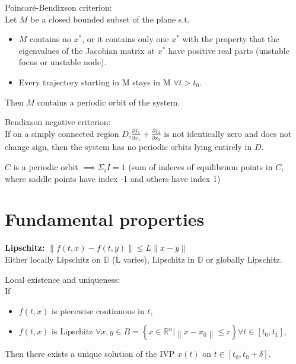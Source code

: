 \begin{tcolorbox}[colback=white, colframe=teal]
\begin{lemma}
    Poincaré-Bendixson criterion:\\
    Let $M$ be a closed bounded subset of the plane s.t.
    \begin{itemize}[topsep=0pt]
        \item $M$ contains no $x^*$, or it
        contains only one $x^*$ with the property that
        the eigenvalues of the Jacobian matrix at $x^*$ have
        positive real parts (unstable focus or unstable node).
        \item Every trajectory starting in M stays in M $\forall t>t_0$.
    \end{itemize}
    Then $M$ contains a periodic orbit of the system.
\end{lemma}
\end{tcolorbox}

\begin{lemma}
    Bendixson negative criterion:\\
    If on a simply connected region $D$,$\frac{\partial f_{1}}{\partial x_{1}}+\frac{\partial f_{2}}{\partial x_{2}}$ is not identically zero and does not change sign, then the
    system has no periodic orbits lying entirely in $D$.
\end{lemma}

\begin{corollary}
    $C$ is a periodic orbit $\implies \Sigma_i I = 1$ (sum of indeces of equilibrium points in $C$, where saddle points have index -1 and others have index 1)
\end{corollary}

\section{Fundamental properties}
\begin{tcolorbox}[colback=white, colframe=teal]
\textbf{Lipschitz:} $\|f(t, x)-f(t, y)\| \leq L\|x-y\|$ \\
Either locally Lipschitz on $\mathbb{D}$ (L varies), Lipschitz in $\mathbb{D}$ or globally Lipschitz.
\end{tcolorbox}

\begin{theorem}
    Local existence and uniqueness:\\
    If
    \begin{itemize}[topsep=0pt]
        \item $f(t, x)$ is piecewise continuous in $t$,
        \item $f(t, x)$ is Lipschitz $\forall x, y \in B=\left\{x \in \mathbb{R}^{n} |\left\|x-x_{0}\right\| \leq r\right\} \forall t \in\left[t_{0}, t_{1}\right]$,
    \end{itemize}
    Then there exists a unique solution of the IVP $x(t)$
    on $t \in\left[t_{0}, t_{0}+\delta\right]$.
\end{theorem}

